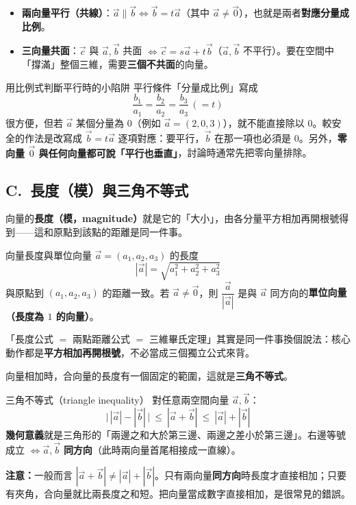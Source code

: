 \documentclass[11pt]{article}
\begin{document}
\begin{itemize}\setlength{\itemsep}{2pt}
\item \textbf{兩向量平行（共線）}：$\vec a\parallel\vec b\iff\vec b=t\vec a$（其中 $\vec a\ne\vec 0$），也就是兩者\textbf{對應分量成比例}。
\item \textbf{三向量共面}：$\vec c$ 與 $\vec a,\vec b$ 共面 $\iff\vec c=s\vec a+t\vec b$（$\vec a,\vec b$ 不平行）。要在空間中「撐滿」整個三維，需要\textbf{三個不共面}的向量。
\end{itemize}

\begin{補充框}{用比例式判斷平行時的小陷阱}
平行條件「分量成比例」寫成
$$\frac{b_1}{a_1}=\frac{b_2}{a_2}=\frac{b_3}{a_3}\,(=t)$$
很方便，但若 $\vec a$ 某個分量為 $0$（例如 $\vec a=(2,0,3)$），就不能直接除以 $0$。較安全的作法是改寫成 $\vec b=t\vec a$ 逐項對應：要平行，$\vec b$ 在那一項也必須是 $0$。另外，\textbf{零向量 $\vec 0$ 與任何向量都可說「平行也垂直」}，討論時通常先把零向量排除。
\end{補充框}

\subsection*{\sffamily C.\ 長度（模）與三角不等式}

向量的\textbf{長度（模，magnitude）}就是它的「大小」，由各分量平方相加再開根號得到——這和原點到該點的距離是同一件事。

\begin{補充框}{向量長度與單位向量}
$\vec a=(a_1,a_2,a_3)$ 的長度
$$\boxed{\;|\vec a|=\sqrt{a_1^2+a_2^2+a_3^2}\;}$$
與原點到 $(a_1,a_2,a_3)$ 的距離一致。若 $\vec a\ne\vec 0$，則 $\dfrac{\vec a}{|\vec a|}$ 是與 $\vec a$ 同方向的\textbf{單位向量（長度為 $1$ 的向量）}。

「長度公式 $=$ 兩點距離公式 $=$ 三維畢氏定理」其實是同一件事換個說法：核心動作都是\textbf{平方相加再開根號}，不必當成三個獨立公式來背。
\end{補充框}

向量相加時，合向量的長度有一個固定的範圍，這就是\textbf{三角不等式}。

\begin{補充框}{三角不等式（triangle inequality）}
對任意兩空間向量 $\vec a,\vec b$：
$$\boxed{\;\bigl|\,|\vec a|-|\vec b|\,\bigr|\ \le\ |\vec a+\vec b|\ \le\ |\vec a|+|\vec b|\;}$$
\textbf{幾何意義}就是三角形的「兩邊之和大於第三邊、兩邊之差小於第三邊」。右邊等號成立 $\iff\vec a,\vec b$ \textbf{同方向}（此時兩向量首尾相接成一直線）。

\textbf{注意：}一般而言 $|\vec a+\vec b|\ne|\vec a|+|\vec b|$。只有兩向量\textbf{同方向}時長度才直接相加；只要有夾角，合向量就比兩長度之和短。把向量當成數字直接相加，是很常見的錯誤。
\end{補充框}
\end{document}
